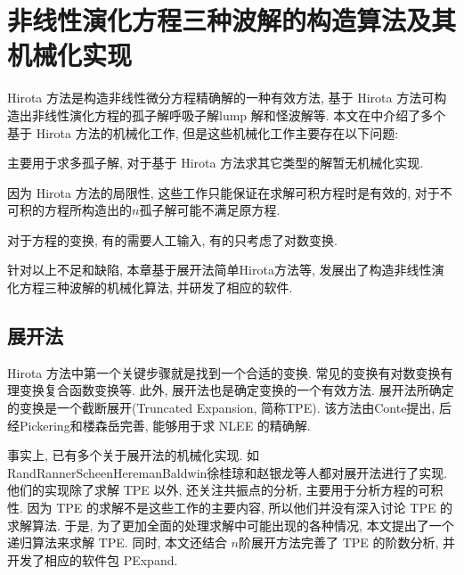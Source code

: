 \chapter{非线性演化方程三种波解的构造算法及其机械化实现}\label{ch02}
Hirota 方法是构造非线性微分方程精确解的一种有效方法, 基于 Hirota 方法可构造出非线性演化方程的孤子解\D 呼吸子解\D lump 解和怪波解等. 本文在中介绍了多个基于 Hirota 方法的机械化工作, 但是这些机械化工作主要存在以下问题:
\begin{inparaenum}[(1)]
\item 主要用于求多孤子解, 对于基于 Hirota 方法求其它类型的解暂无机械化实现.
\item 因为 Hirota 方法的局限性, 这些工作只能保证在求解可积方程时是有效的, 对于不可积的方程所构造出的$n$孤子解可能不满足原方程. 
\item 对于方程的变换, 有的需要人工输入, 有的只考虑了对数变换. 
\end{inparaenum}

针对以上不足和缺陷, 本章基于\Painleve{}展开法\D 简单Hirota方法等, 发展出了构造非线性演化方程三种波解的机械化算法, 并研发了相应的软件. 

\section{\Painleve{}展开法}

Hirota 方法中第一个关键步骤就是找到一个合适的变换. 常见的变换有对数变换\D 有理变换\D 复合函数变换等.  此外, \Painleve{}展开法也是确定变换的一个有效方法. \Painleve{}展开法所确定的变换是一个\Painleve{}截断展开(Truncated \Painleve{} Expansion, 简称TPE). 该方法由Conte\cite{conte1989invariant}提出, 后经Pickering\cite{pickering1993new}和楼森岳\cite{lou1998extended}完善, 能够用于求 NLEE 的精确解.

事实上, 已有多个关于\Painleve{}展开法的机械化实现. 如 Rand\cite{rand1986odepainleve}\D Ranner\cite{renner1992constructive}\D Scheen\cite{scheen1997implementation}\D Hereman\cite{hereman1989painleve,hereman1998algorithmic}\D Baldwin\cite{baldwin2004symbolic,baldwin2006symbolic}\D 徐桂琼\cite{xu2004symbolic,xu2005pdeptest,xuPHD}和赵银龙\cite{zhaoMST}等人都对\Painleve{}展开法进行了实现. 他们的实现除了求解 TPE 以外, 还关注共振点的分析, 主要用于分析方程的可积性. 因为 TPE 的求解不是这些工作的主要内容, 所以他们并没有深入讨论 TPE 的求解算法. 于是, 为了更加全面的处理求解中可能出现的各种情况, 本文提出了一个递归算法来求解 TPE. 同时, 本文还结合 $n$阶展开方法完善了 TPE 的阶数分析, 并开发了相应的软件包 PExpand. 

